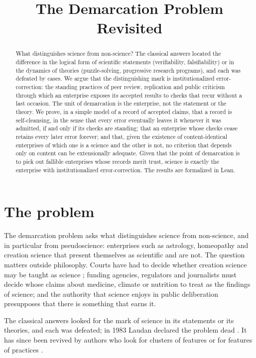 \documentclass{situationist-preprint}
\title{The Demarcation Problem Revisited}
\begin{document}
\maketitle

\begin{abstract}
What distinguishes science from non-science? The classical answers located the difference in the logical form of scientific statements (verifiability, falsifiability) or in the dynamics of theories (puzzle-solving, progressive research programs), and each was defeated by cases. We argue that the distinguishing mark is institutionalized error-correction: the standing practices of peer review, replication and public criticism through which an enterprise exposes its accepted results to checks that recur without a last occasion. The unit of demarcation is the enterprise, not the statement or the theory. We prove, in a simple model of a record of accepted claims, that a record is self-cleansing, in the sense that every error eventually leaves it whenever it was admitted, if and only if its checks are standing; that an enterprise whose checks cease retains every later error forever; and that, given the existence of content-identical enterprises of which one is a science and the other is not, no criterion that depends only on content can be extensionally adequate. Given that the point of demarcation is to pick out fallible enterprises whose records merit trust, science is exactly the enterprise with institutionalized error-correction. The results are formalized in Lean.
\end{abstract}

\section{The problem}

The demarcation problem asks what distinguishes science from non-science, and in particular from pseudoscience: enterprises such as astrology, homeopathy and creation science that present themselves as scientific and are not. The question matters outside philosophy. Courts have had to decide whether creation science may be taught as science \citep{Ruse1982,Laudan1982}; funding agencies, regulators and journalists must decide whose claims about medicine, climate or nutrition to treat as the findings of science; and the authority that science enjoys in public deliberation presupposes that there is something that earns it.

The classical answers looked for the mark of science in its statements or its theories, and each was defeated; in 1983 Laudan declared the problem dead \citep{Laudan1983}. It has since been revived by authors who look for clusters of features or for features of practices \citep{PigliucciBoudry2013,Hansson2013,HoyningenHuene2013}.
\end{document}
